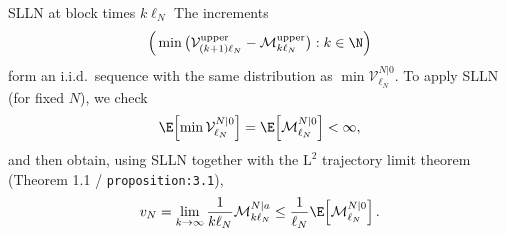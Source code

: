 \begin{block}{SLLN at block times $k\ell_N$}
The increments
\[
    \Big(\min\big(\mathcal V^{\mathrm{upper}}_{(k+1)\ell_N}-\mathcal M^{\mathrm{upper}}_{k\ell_N}\big):k\in\N\Big)
\]
form an i.i.d.\ sequence with the same distribution as $\min\mathcal V^{N|0}_{\ell_N}$.
To apply SLLN (for fixed $N$), we check
\[
    \E\!\left[\min\mathcal V^{N|0}_{\ell_N}\right]
    =
    \E\!\left[\mathcal M^{N|0}_{\ell_N}\right]
    <\infty,
\]
and then obtain, using SLLN together with the $\mathrm L^2$ trajectory limit theorem (Theorem 1.1 / \texttt{proposition:3.1}),
\[
    v_N
    =
    \lim_{k\to\infty}\frac{1}{k\ell_N}\mathcal M^{N|a}_{k\ell_N}
    \le
    \frac{1}{\ell_N}\E\!\left[\mathcal M^{N|0}_{\ell_N}\right].
\]
\end{block}

